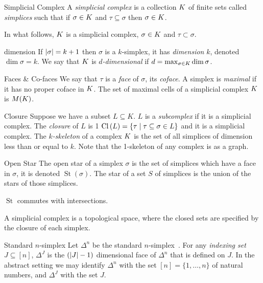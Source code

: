 \begin{definition}{Simplicial Complex}
A \emph{simplicial complex} is a collection $K$ of finite sets called
\emph{simplices} such that if $\sigma \in K$ and $\tau \subseteq \sigma$ then $\sigma \in K$. 
\end{definition}
In what follows, $K$ is a simplicial complex, $\sigma \in K$ and $\tau \subset \sigma$.
\begin{definition}{dimension}
If $|\sigma| = k+1$ then $\sigma$ is a $k$-simplex, it has \emph{dimension} $k$, denoted 
$\dim{\sigma} = k$. We say that $K$ is \emph{$d$-dimensional} if 
$d = \max_{\sigma \in K} \dim{\sigma}$.
\end{definition}
\begin{definition}{Faces \& Co-faces}
We say that $\tau$ is a \emph{face} of $\sigma$, its \emph{coface}. A simplex is \emph{maximal} if it has no proper coface in $K$. The set of maximal cells of a simplicial complex $K$ is $M(K)$. 
 \end{definition}
\begin{definition}{Closure}
Suppose we have a subset $L \subseteq K$.  $L$ is a \emph{subcomplex}
if it is a simplicial complex. The \emph{closure} of $L$ is 1
$\operatorname{Cl}{(}L) = \{ \tau \mid \tau \subseteq \sigma \in L\}$ and it is a simplicial complex. The 
\emph{$k$-skeleton} of a complex $K$ is the set of all simplices
of dimension less than or equal to $k$. Note that the 1-skeleton of
any complex is as a graph.
\end{definition}
\begin{definition}{Open Star}
The open star of a simplex $\sigma$ is the set of simplices which have a face in $\sigma$, it is denoted $\operatorname{St}(\sigma)$. The star of a set $S$ of simplices is the union of the stars of those simplices.
\end{definition}
\begin{lemma}
$\operatorname{St}$ commutes with intersections.
\label{lem:st-inter}
\end{lemma}
A simplicial complex is a topological space, where the closed sets are specified by the closure of each simplex.
\begin{definition}{Standard $n$-simplex}
Let $\Delta^n$ be the standard $n$-simplex~\cite{hatcher}. For any
\emph{indexing set} $J \subseteq [n]$, $\Delta^J$ is the $(|J|-1)$ 
dimensional face of $\Delta^n$  that is defined on $J$. In the abstract setting we may
identify $\Delta^n$ with the set $[n] = \{1, \ldots, n\}$ of natural numbers, and $\Delta^J$ with the set $J$.
\end{definition}
